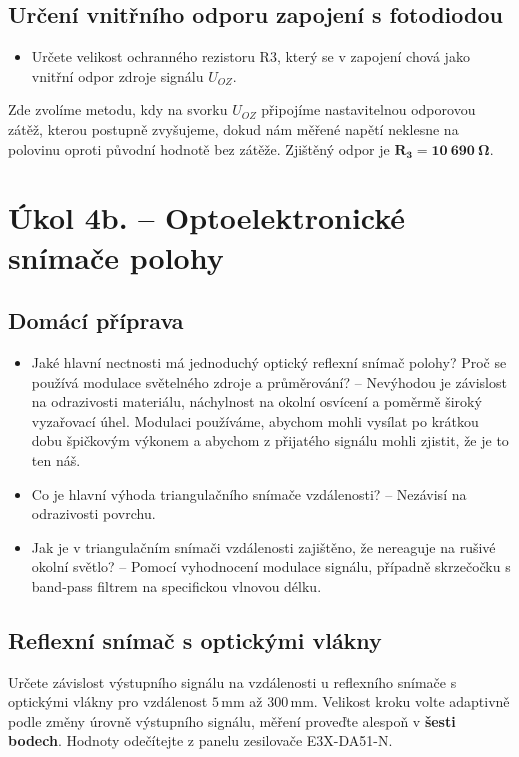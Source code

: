 \documentclass[a4paper,12pt]{article}
\begin{document}
\subsection{Určení vnitřního odporu zapojení s fotodiodou}
\begin{itemize}
  \item Určete velikost ochranného rezistoru R3, který se v zapojení chová jako vnitřní odpor zdroje signálu $U_{OZ}.$
\end{itemize}
Zde zvolíme metodu, kdy na svorku $U_{OZ}$ připojíme nastavitelnou odporovou zátěž, kterou postupně zvyšujeme, dokud nám měřené napětí neklesne na polovinu oproti původní hodnotě bez zátěže. Zjištěný odpor je $\mathbf{R_3 = 10\ 690\ \Omega}$.

\section{Úkol 4b. -- Optoelektronické snímače polohy}
\subsection{Domácí příprava}
\begin{itemize}
\item Jaké hlavní nectnosti má jednoduchý optický reflexní snímač polohy? Proč se používá modulace světelného zdroje a průměrování? -- Nevýhodou je závislost na odrazivosti materiálu, náchylnost na okolní osvícení a poměrmě široký vyzařovací úhel. Modulaci používáme, abychom mohli vysílat po krátkou dobu špičkovým výkonem a abychom z přijatého signálu mohli zjistit, že je to ten náš.
\item Co je hlavní výhoda triangulačního snímače vzdálenosti? -- Nezávisí na odrazivosti povrchu.
\item Jak je v triangulačním snímači vzdálenosti zajištěno, že nereaguje na rušivé okolní světlo? -- Pomocí vyhodnocení modulace signálu, případně skrzečočku s band-pass filtrem na specifickou vlnovou délku.
\end{itemize}

\newpage
\subsection{Reflexní snímač s optickými vlákny}
Určete závislost výstupního signálu na vzdálenosti u reflexního snímače s optickými vlákny pro vzdálenost $5\,\mathrm{mm}$ až $300\,\mathrm{mm}$. Velikost kroku volte adaptivně podle změny úrovně výstupního signálu, měření proveďte alespoň v \textbf{šesti bodech}. Hodnoty odečítejte z panelu zesilovače E3X-DA51-N.
\end{document}
